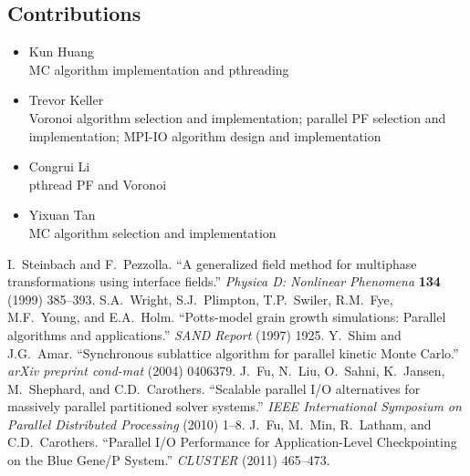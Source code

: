 \documentclass[11pt]{article}
\begin{document}
\begin{multicols*}{2}
\section{Contributions}
\begin{itemize}
 \item Kun Huang\\
	MC algorithm implementation and pthreading
 \item Trevor Keller\\
	Voronoi algorithm selection and implementation; parallel PF selection and implementation; MPI-IO algorithm design and implementation
 \item Congrui Li\\
	pthread PF and Voronoi
 \item Yixuan Tan\\
	MC algorithm selection and implementation
\end{itemize}

\label{LastPage}
\begin{footnotesize}
\begin{thebibliography}{1}
   I.~Steinbach and F.~Pezzolla. ``A generalized field method for multiphase transformations using interface fields.'' \emph{Physica D: Nonlinear Phenomena} \textbf{134} (1999) 385--393.
   S.A.~Wright, S.J.~Plimpton, T.P.~Swiler, R.M.~Fye, M.F.~Young, and E.A.~Holm. ``Potts-model grain growth simulations: Parallel algorithms and applications.'' \emph{SAND Report} (1997) 1925.
   Y.~Shim and J.G.~Amar. ``Synchronous sublattice algorithm for parallel kinetic Monte Carlo.'' \emph{arXiv preprint cond-mat} (2004) 0406379.
   J.~Fu, N.~Liu, O.~Sahni, K.~Jansen, M.~Shephard, and C.D.~Carothers. ``Scalable parallel I/O alternatives for massively parallel partitioned solver systems.'' \emph{IEEE International Symposium on Parallel Distributed Processing} (2010) 1--8.
   J.~Fu, M.~Min, R.~Latham, and C.D.~Carothers. ``Parallel I/O Performance for Application-Level Checkpointing on the Blue Gene/P System.'' \emph{CLUSTER} (2011) 465--473.
\end{thebibliography}
\end{footnotesize}
\end{multicols*}
\end{document}
